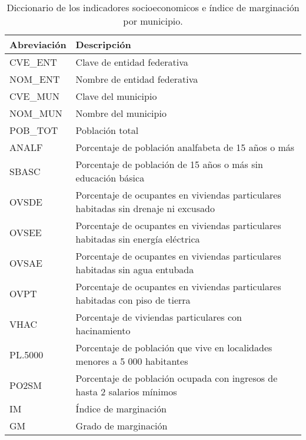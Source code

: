 \begin{table}[H]
    \centering
    \changefontsizes{10pt}
    \begin{tabular}{ll} \hline
        Abreviación & Descripción                                                                         \\  \hline
        CVE\_ENT    & Clave de entidad federativa                                                         \\
        NOM\_ENT    & Nombre de entidad federativa                                                        \\
        CVE\_MUN    & Clave del municipio                                                                 \\
        NOM\_MUN    & Nombre del municipio                                                                \\
        POB\_TOT    & Población total                                                                     \\
        ANALF       & Porcentaje de población analfabeta de 15 años o más                                 \\
        SBASC       & Porcentaje de población de 15 años o más sin educación básica                       \\
        OVSDE       & Porcentaje de ocupantes en viviendas particulares habitadas sin drenaje ni excusado \\
        OVSEE       & Porcentaje de ocupantes en viviendas particulares habitadas sin energía eléctrica   \\
        OVSAE       & Porcentaje de ocupantes en viviendas particulares habitadas sin agua entubada       \\
        OVPT        & Porcentaje de ocupantes en viviendas particulares habitadas con piso de tierra      \\
        VHAC        & Porcentaje de viviendas particulares con hacinamiento                               \\
        PL.5000     & Porcentaje de población que vive en localidades menores a 5 000 habitantes          \\
        PO2SM       & Porcentaje de población ocupada con ingresos de hasta 2 salarios mínimos            \\
        IM          & Índice de marginación                                                               \\
        GM          & Grado de marginación                                                                \\ \hline
    \end{tabular}
    \caption{Diccionario de los indicadores socioeconomicos e índice de marginación por municipio.}
    \label{table:diccionario}
\end{table}